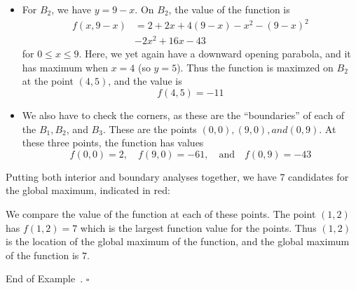\documentclass[10pt]{article}
\theoremstyle{definition}
\newtheorem{example}[theorem]{Example}
\renewenvironment{example}
{\begin{oldexample}}
  {\par\smallskip\hfill   End of Example~\theexample. $\square$    \par\end{oldexample}}
\newcommand{\1}[1]{\textbf{1}_{\left[#1\right]}} %
\begin{document}
\begin{example}
\begin{itemize}
    \item For $B_{2}$, we have $y=9-x$. On $B_{2}$, the value of the function
    is
    \begin{align*}
      f(x,9-x) 
      &= 2+2x+4(9-x)-x^{2} - (9-x)^{2}\\
      &-2x^{2}+16x-43
    \end{align*}
    for $0 \leq x \leq 9$. Here, we yet again have a downward opening
    parabola, and it has maximum when $x=4$ (so $y=5$). Thus the function is
    maximzed on $B_{2}$ at the point $(4,5)$, and the value is
    \begin{equation*}
      f(4,5) = -11
    \end{equation*}
    \item We also have to check the corners, as these are the ``boundaries''
    of each of the $B_{1},B_{2}$, and $B_{3}$. These are the points $(0,0),
    (9,0), and (0,9)$. At these three points, the function has values
    \begin{equation*}
      f(0,0) = 2, \quad f(9,0)=-61, \quad \text{and} \quad f(0,9) = -43
    \end{equation*}
  \end{itemize}
  Putting both interior and boundary analyses together, we have 7 candidates
  for the global maximum, indicated in red:
  \begin{center}
  \end{center}

  We compare the value of the function at each of these points. The point
  $(1,2)$ has $f(1,2)=7$ which is the largest function value for the points.
  Thus $(1,2)$ is the location of the global maximum of the function, and the global maximum of the
  function is $7$. 
\end{example}
\end{document}
